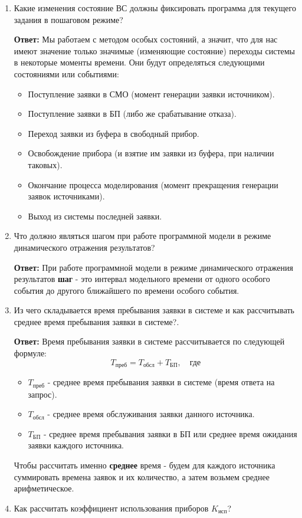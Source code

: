 \documentclass[a4paper, 14pt]{article}
\begin{document}
\begin{enumerate}
	\item Какие изменения состояние ВС должны фиксировать программа для текущего задания в пошаговом режиме?

	      \textbf{Ответ:} Мы работаем с методом особых состояний, а значит, что для нас имеют значение только значимые (изменяющие состояние) переходы системы в некоторые моменты времени. Они будут определяться следующими состояниями или событиями:
	      \begin{itemize}
		      \item Поступление заявки в СМО (момент генерации заявки источником).
		      \item Поступление заявки в БП (либо же срабатывание отказа).
		      \item Переход заявки из буфера в свободный прибор.
		      \item Освобождение прибора (и взятие им заявки из буфера, при наличии таковых).
		      \item Окончание процесса моделирования (момент прекращения генерации заявок источниками).
		      \item Выход из системы последней заявки.
	      \end{itemize}
	\item Что должно являться шагом при работе программной модели в режиме динамического отражения результатов?

	      \textbf{Ответ:} При работе программной модели в режиме динамического отражения результатов \textbf{шаг} - это интервал модельного времени от одного особого события до другого ближайшего по времени особого события.
	\item Из чего складывается время пребывания заявки в системе и как рассчитывать среднее время пребывания заявки в системе?.

	      \textbf{Ответ:} Время пребывания заявки в системе рассчитывается по следующей формуле:
	      $$T_{\text{преб}} = T_{\text{обсл}} + T_{\text{БП}}, \quad \text{где}$$
	      \begin{itemize}
		      \item $T_{\text{преб}}$ - среднее время пребывания заявки в системе (время ответа на запрос).
		      \item $T_{\text{обсл}}$ - среднее время обслуживания заявки данного источника.
		      \item $T_{\text{БП}}$ - среднее время пребывания заявки в БП или среднее время ожидания заявки каждого источника.
	      \end{itemize}
	      Чтобы рассчитать именно \textbf{среднее} время - будем для каждого источника суммировать времена заявок и их количество, а затем возьмем среднее арифметическое.
	\item Как рассчитать коэффициент использования приборов $K_{\text{исп}}$?


\end{enumerate}
\end{document}
